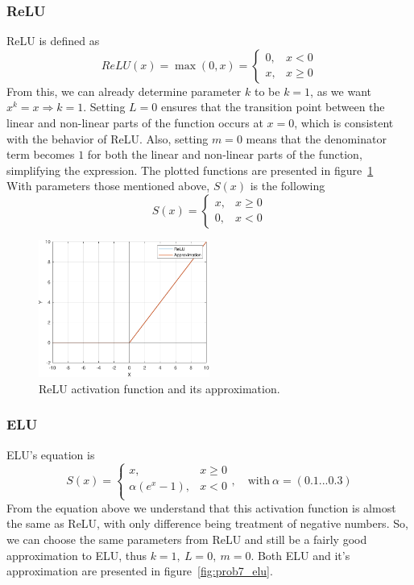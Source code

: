 \subsubsection{ReLU}
ReLU is defined as 
\[
ReLU(x) = \max(0,x) = \left\{
\begin{array}{cc}
	0, & x<0\\
	x, & x \ge 0
\end{array}
\right.
\]
From this, we can already determine parameter $k$ to be $k=1$, as we want $x^k = x \Rightarrow k=1$.
Setting $L=0$ ensures that the transition point between the linear and non-linear parts of the function occurs at $x=0$, which is consistent with the behavior of ReLU.
Also, setting $m=0$ means that the denominator term becomes $1$ for both the linear and non-linear parts of the function, simplifying the expression.
The plotted functions are presented in figure~\ref{fig:prob7_relu}\\
With parameters those mentioned above, $S(x)$ is the following
\[
S(x) = \left\{
\begin{array}{cc}
	x, & x\ge 0\\
	0, & x < 0
\end{array}
\right.
\]

\begin{figure}[H]
	\centering
	\includegraphics[width=0.5\textwidth]{../Problem 7/prob7_relu.pdf}
	\caption{ReLU activation function and its approximation.}
	\label{fig:prob7_relu}
\end{figure}

\subsubsection{ELU}
ELU's equation is 
\[
S(x) = \left\{
\begin{array}{cc}
	x, & x \ge 0\\
	\alpha \left(e^x - 1\right), & x<0\\
\end{array}
\right., \quad \text{with} \ \alpha=\left(0.1...0.3\right)
\]
From the equation above we understand that this activation function is almost the same as ReLU, with only difference being treatment of negative numbers. So, we can choose the same parameters from ReLU and still be a fairly good approximation to ELU, thus $k=1,\ L=0,\ m=0$.
Both ELU and it's approximation are presented in figure~\ref{fig:prob7_elu}.

